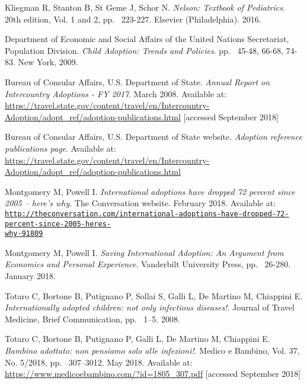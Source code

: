 
\begin{thebibliography}{50}

  Kliegman R, Stanton B, St Geme J, Schor N.
  \textit{Nelson: Textbook of Pediatrics}.
  20th edition, Vol. 1 and 2,
  pp. ~223-227.
  Elsevier (Philadelphia).
  2016.
  
  Department of Economic and Social Affairs of the United Nations Secretariat, Population Division.
  \textit{Child Adoption: Trends and Policies}.
  pp. ~45-48, 66-68, 74-83.
  New York,
  2009.

  Bureau of Consular Affairs, U.S. Department of State.
  \textit{Annual Report on Intercountry Adoptions - FY 2017}.
  March 2008.
  Available at: \url{https://travel.state.gov/content/travel/en/Intercountry-Adoption/adopt_ref/adoption-publications.html} [accessed September 2018]
  
  Bureau of Consular Affairs, U.S. Department of State website.
  \textit{Adoption reference publications page}.
  Available at: \url{https://travel.state.gov/content/travel/en/Intercountry-Adoption/adopt_ref/adoption-publications.html}

  Montgomery M, Powell I.
  \textit{International adoptions have dropped 72 percent since 2005 – here’s why}.
  The Conversation website.
  February 2018.
  Available at: \href{http://theconversation.com/international-adoptions-have-dropped-72-percent-since-2005-heres-why-91809}{\nolinkurl{http://theconversation.com/international-adoptions-have-dropped-72-percent-since-2005-heres-}
  \\
  \nolinkurl{why-91809}}
  
  Montgomery M, Powell I.
  \textit{Saving International Adoption: An Argument from Economics and Personal Experience}.
  Vanderbilt University Press,
  pp. ~26-280.
  January 2018.
  
  Totaro C, Bortone B, Putignano P, Sollai S, Galli L, De Martino M, Chiappini E.
  \textit{Internationally adopted children: not only infectious diseases!}.
  Journal of Travel Medicine,
  Brief Communication,
  pp. ~1–5.
  2008.
  
  Totaro C, Bortone B, Putignano P, Galli L, De Martino M, Chiappini E.
  \textit{Bambino adottato: non pensiamo solo alle infezioni!}.
  Medico e Bambino, Vol. 37, No. 5/2018,
  pp. ~307–3012.
  May 2018.
  Available at: \url{https://www.medicoebambino.com/?id=1805_307.pdf} [accessed September 2018]
  

\end{thebibliography}
